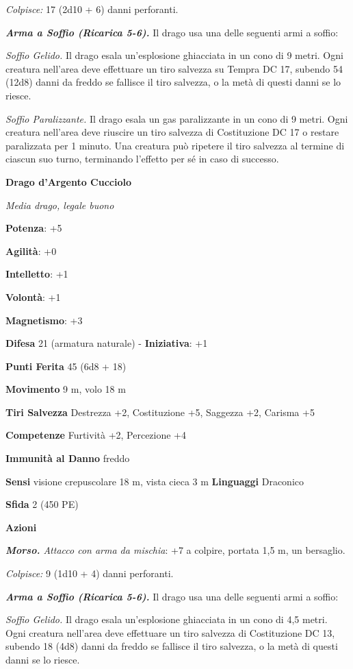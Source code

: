 \begin{multicols}{2}
\emph{Colpisce:} 17 (2d10 + 6) danni perforanti.

\emph{\textbf{Arma a Soffio (Ricarica 5-6).}} Il drago usa una delle
seguenti armi a soffio:

\emph{Soffio Gelido.} Il drago esala un'esplosione ghiacciata in un cono
di 9 metri. Ogni creatura nell'area deve effettuare un tiro salvezza su Tempra DC 17, subendo 54 (12d8) danni da freddo se fallisce il
tiro salvezza, o la metà di questi danni se lo riesce.

\emph{Soffio Paralizzante.} Il drago esala un gas paralizzante in un
cono di 9 metri. Ogni creatura nell'area deve riuscire un tiro salvezza
di Costituzione DC 17 o restare paralizzata per 1 minuto. Una creatura
può ripetere il tiro salvezza al termine di ciascun suo turno,
terminando l'effetto per sé in caso di successo.

\textbf{Drago d'Argento Cucciolo}

\emph{Media drago, legale buono}

\textbf{Potenza}: +5

\textbf{Agilità}: +0

\textbf{Intelletto}: +1

\textbf{Volontà}: +1

\textbf{Magnetismo}: +3

\textbf{Difesa} 21 (armatura naturale) - \textbf{Iniziativa}: +1

\textbf{Punti Ferita} 45 (6d8 + 18)

\textbf{Movimento} 9 m, volo 18 m

\textbf{Tiri Salvezza} Destrezza +2, Costituzione +5, Saggezza +2,
Carisma +5

\textbf{Competenze} Furtività +2, Percezione +4

\textbf{Immunità al Danno} freddo

\textbf{Sensi} visione crepuscolare 18 m, vista cieca 3 m
\textbf{Linguaggi} Draconico

\textbf{Sfida} 2 (450 PE)

\textbf{Azioni}

\emph{\textbf{Morso.} Attacco con arma da mischia}: +7 a colpire,
portata 1,5 m, un bersaglio.

\emph{Colpisce:} 9 (1d10 + 4) danni perforanti.

\emph{\textbf{Arma a Soffio (Ricarica 5-6).}} Il drago usa una delle
seguenti armi a soffio:

\emph{Soffio Gelido.} Il drago esala un'esplosione ghiacciata in un cono
di 4,5 metri. Ogni creatura nell'area deve effettuare un tiro salvezza
di Costituzione DC 13, subendo 18 (4d8) danni da freddo se fallisce il
tiro salvezza, o la metà di questi danni se lo riesce.


\end{multicols}
